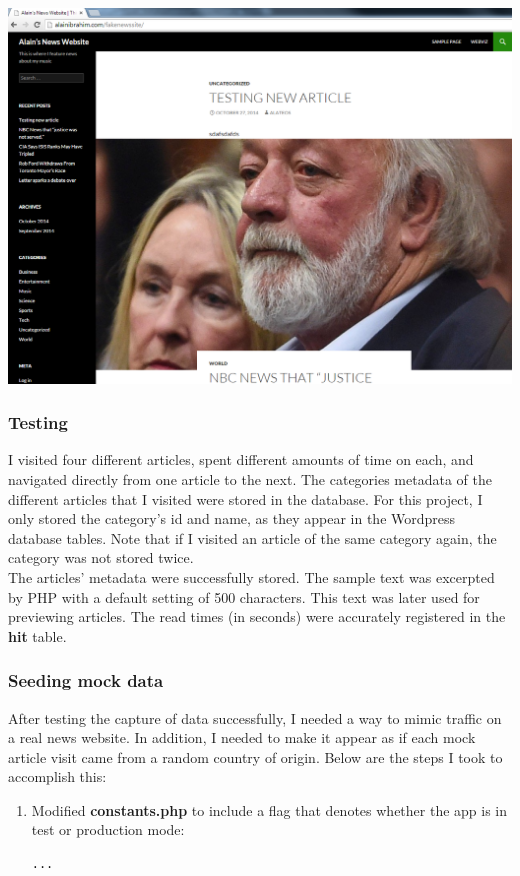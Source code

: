 \documentclass[12pt]{article}
\begin{document}
{\noindent\includegraphics[scale=0.4]{img/fakenewssite_main} 

\newpage

\subsubsection{Testing} 
I visited four different articles, spent different amounts of time on each, and navigated directly from one article to the next.
\noindent The categories metadata of the different articles that I visited were stored in the database. For this project, I only stored the category's id and name, as they appear in the Wordpress database tables. Note that if I visited an article of the same category again, the category was not stored twice. \\
The articles' metadata were successfully stored. The sample text was excerpted by PHP with a default setting of 500 characters. This text was later used for previewing articles. The read times (in seconds) were accurately registered in the \textbf{hit} table. 

\subsubsection{Seeding mock data}
After testing the capture of data successfully, I needed a way to mimic traffic on a real news website. In addition, I needed to make it appear as if each mock article visit came from a random country of origin. Below are the steps I took to accomplish this:

\begin{enumerate}
\item{Modified \textbf{constants.php} to include a flag that denotes whether the app is in test or production mode:}
\begin{lstlisting}[basicstyle=\scriptsize]
...


\end{lstlisting}
\end{enumerate}}
\end{document}
